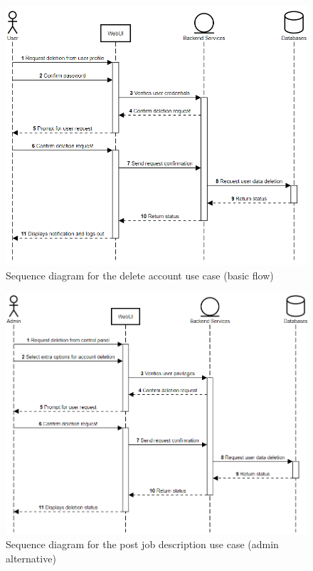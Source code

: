 \documentclass[a4paper]{article}
\begin{document}
\begin{figure}[H]
    \centering
    \includegraphics[width=1.0\textwidth]{delete_account.png}
    \caption{Sequence diagram for the delete account use case (basic flow)}
    \label{fig:fig17}
\end{figure}

\begin{figure}[H]
    \centering
    \includegraphics[width=1.0\textwidth]{delete_account (admin).png}
    \caption{Sequence diagram for the post job description use case (admin alternative)}
    \label{fig:fig18}
\end{figure}
\end{document}
